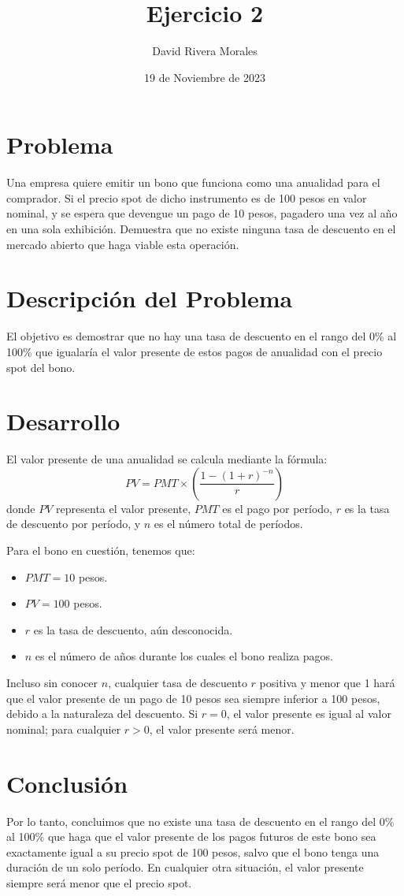 \documentclass{article}
\title{Ejercicio 2}
\author{David Rivera Morales}
\date{19 de Noviembre de 2023}
\begin{document}
\maketitle

\section{Problema}
Una empresa quiere emitir un bono que funciona como una anualidad para el comprador. Si el precio spot de dicho instrumento es de 100 pesos en valor nominal, y se espera que devengue un pago de 10 pesos, pagadero una vez al año en una sola exhibición. Demuestra que no existe ninguna tasa de descuento en el mercado abierto que haga viable esta operación.

\section{Descripción del Problema}
El objetivo es demostrar que no hay una tasa de descuento en el rango del 0\% al 100\% que igualaría el valor presente de estos pagos de anualidad con el precio spot del bono.

\section{Desarrollo}
El valor presente de una anualidad se calcula mediante la fórmula:
\[ PV = PMT \times \left( \frac{1 - (1 + r)^{-n}}{r} \right) \]
donde \( PV \) representa el valor presente, \( PMT \) es el pago por período, \( r \) es la tasa de descuento por período, y \( n \) es el número total de períodos.

Para el bono en cuestión, tenemos que:
\begin{itemize}
    \item \( PMT = 10 \) pesos.
    \item \( PV = 100 \) pesos.
    \item \( r \) es la tasa de descuento, aún desconocida.
    \item \( n \) es el número de años durante los cuales el bono realiza pagos.
\end{itemize}

Incluso sin conocer \( n \), cualquier tasa de descuento \( r \) positiva y menor que 1 hará que el valor presente de un pago de 10 pesos sea siempre inferior a 100 pesos, debido a la naturaleza del descuento. Si \( r = 0 \), el valor presente es igual al valor nominal; para cualquier \( r > 0 \), el valor presente será menor.

\section{Conclusión}
Por lo tanto, concluimos que no existe una tasa de descuento en el rango del 0\% al 100\% que haga que el valor presente de los pagos futuros de este bono sea exactamente igual a su precio spot de 100 pesos, salvo que el bono tenga una duración de un solo período. En cualquier otra situación, el valor presente siempre será menor que el precio spot.
\end{document}
